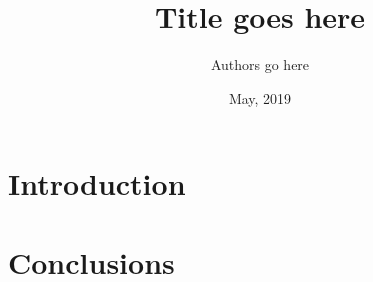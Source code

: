 \documentclass[fullpage,twoside,11pt]{article}
\begin{document}
\title{Title goes here}

\author{Authors go here}

\date{May, 2019}

\makeCAPSLcover

\maketitle

\tableofcontents
\newpage

\begin{abstract}

\end{abstract}

\section{Introduction}




\section{Conclusions} 



\balance %
 
\end{document}
